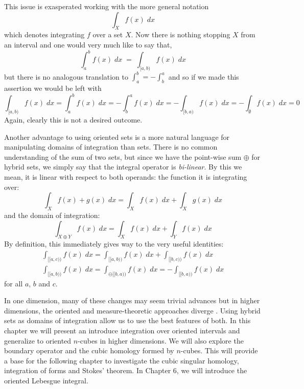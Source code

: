 This issue is exasperated working with the more general notation
\begin{equation*}
	\int_X f(x) \; dx
\end{equation*}
which denotes integrating $f$ over a set $X$.
Now there is nothing stopping $X$ from an interval and one would very much like to say that,
\begin{equation*}
	\int_a^b f(x) \; dx \;=\; \int_{[a,b)} f(x) \; dx
\end{equation*}
but there is no analogous translation to $\int_a^b = - \int_b^a$ and so if we made this assertion we would be left with
\begin{equation*}
	\int_{[a,b)} f(x) \; dx 
		= \int_a^b f(x) \; dx 
		= -\int_b^a f(x) \; dx 
		= - \int_{[b,a)} f(x)\; dx 
		= -\int_\emptyset f(x)\;dx 	
		= 0
\end{equation*}
Again, clearly this is not a desired outcome.


Another advantage to using oriented sets is a more natural language for manipulating domains of integration than sets.
There is no common understanding of the sum of two sets, but since we have the point-wise sum $\oplus$ for hybrid sets, we simply say that the integral operator is \emph{bi-linear}.
By this we mean, it is linear with respect to both operands: the function it is integrating over:
\begin{equation}
	\int_{X} f(x) + g(x) \; dx = \int_X f(x) \;dx + \int_X g(x) \; dx
\end{equation}
and the domain of integration:
\begin{equation}
	\int_{X\oplus Y} f(x) \; dx = \int_{X} f(x) \; dx + \int_Y f(x) \; dx
\end{equation}
By definition, this immediately gives way to the very useful identities:
\begin{align}
	\int_{[\![a,c)\!)} f(x) \; dx = \int_{[\![a,b)\!)} f(x) \; dx + \int_{[\![b,c)\!)} f(x) \; dx \\
	\int_{[\![a,b)\!)} f(x) \; dx = \int_{\ominus [\![b,a)\!)} f(x) \; dx = - \int_{[\![b,a)\!)} f(x) \; dx
\end{align}
for all $a$, $b$ and $c$.



In one dimension, many of these changes may seem trivial advances but in higher dimensions, the oriented and measure-theoretic approaches diverge \cite{tao2007differential}.
Using hybrid sets as domains of integration allow us to use the best features of both.
In this chapter we will present an introduce integration over oriented intervals and generalize to oriented $n$-cubes in higher dimensions.
We will also explore the boundary operator and the cubic homology formed by $n$-cubes.
This will provide a base for the following chapter to investigate the cubic singular homology, integration of forms and Stokes' theorem.
In Chapter 6, we will introduce the oriented Lebesgue integral.


